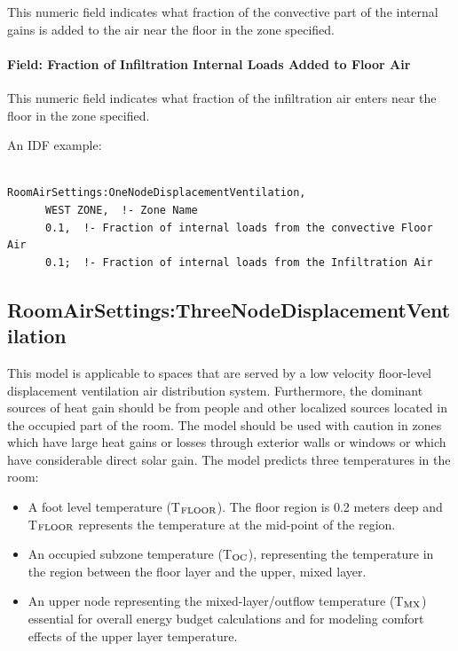 This numeric field indicates what fraction of the convective part of the internal gains is added to the air near the floor in the zone specified.

\paragraph{Field: Fraction of Infiltration Internal Loads Added to Floor Air}\label{field-fraction-of-infiltration-internal-loads-added-to-floor-air}

This numeric field indicates what fraction of the infiltration air enters near the floor in the zone specified.

An IDF example:

\begin{lstlisting}

RoomAirSettings:OneNodeDisplacementVentilation,
      WEST ZONE,  !- Zone Name
      0.1,  !- Fraction of internal loads from the convective Floor Air
      0.1;  !- Fraction of internal loads from the Infiltration Air
\end{lstlisting}

\subsection{RoomAirSettings:ThreeNodeDisplacementVentilation}\label{roomairsettingsthreenodedisplacementventilation}

This model is applicable to spaces that are served by a low velocity floor-level displacement ventilation air distribution system. Furthermore, the dominant sources of heat gain should be from people and other localized sources located in the occupied part of the room. The model should be used with caution in zones which have large heat gains or losses through exterior walls or windows or which have considerable direct solar gain. The model predicts three temperatures in the room:

\begin{itemize}
\item
  A foot level temperature (T\(_{\rm{FLOOR}}\)). The floor region is 0.2 meters deep and T\(_{\rm{FLOOR}}\) represents the temperature at the mid-point of the region.
\item
  An occupied subzone temperature (T\(_{\rm{OC}}\)), representing the temperature in the region between the floor layer and the upper, mixed layer.
\item
  An upper node representing the mixed-layer/outflow temperature (T\(_{\rm{MX}}\)) essential for overall energy budget calculations and for modeling comfort effects of the upper layer temperature.
\end{itemize}

